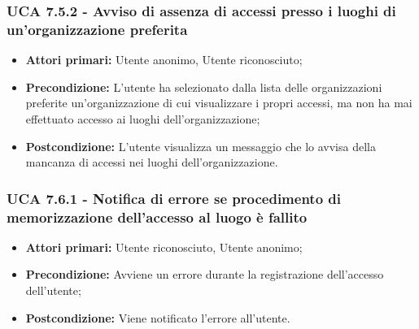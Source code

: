 \subsubsection{UCA 7.5.2 - Avviso di assenza di accessi presso i luoghi di un'organizzazione preferita}
\begin{itemize}
    \item \textbf{Attori primari:} Utente anonimo, Utente riconosciuto;
    \item \textbf{Precondizione:} L'utente ha selezionato dalla lista delle organizzazioni preferite un'organizzazione di cui visualizzare i propri accessi, ma non ha mai effettuato accesso ai luoghi dell'organizzazione;
    \item \textbf{Postcondizione:} L'utente visualizza un messaggio che lo avvisa della mancanza di accessi nei luoghi dell'organizzazione.
\end{itemize}

\subsubsection{UCA 7.6.1 - Notifica di errore se procedimento di memorizzazione dell'accesso al luogo è fallito}
\begin{itemize}
	\item \textbf{Attori primari:} Utente riconosciuto, Utente anonimo;
	\item \textbf{Precondizione:} Avviene un errore durante la registrazione dell'accesso dell'utente;
	\item \textbf{Postcondizione:} Viene notificato l'errore all'utente.
\end{itemize}